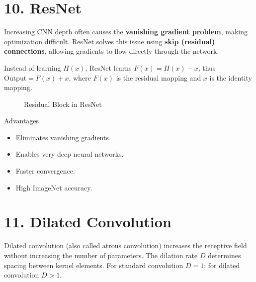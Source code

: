 \documentclass[11pt]{article}
\begin{document}

\section*{10. ResNet}

Increasing CNN depth often causes the \textbf{vanishing gradient problem},
making optimization difficult. ResNet solves this issue using
\textbf{skip (residual) connections}, allowing gradients to flow directly
through the network.

Instead of learning $H(x)$, ResNet learns $F(x)=H(x)-x$, thus
$\text{Output} = F(x)+x$, where $F(x)$ is the residual mapping and
$x$ is the identity mapping.

\begin{figure}[H]
\centering


\caption{Residual Block in ResNet}
\end{figure}

Advantages

\begin{itemize}
\item Eliminates vanishing gradients.
\item Enables very deep neural networks.
\item Faster convergence.
\item High ImageNet accuracy.
\end{itemize}


\section*{11. Dilated Convolution}

Dilated convolution (also called atrous convolution) increases the
receptive field without increasing the number of parameters.
The dilation rate $D$ determines spacing between kernel elements.
For standard convolution $D=1$; for dilated convolution $D>1$.
\end{document}
